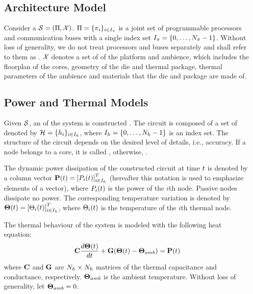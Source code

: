 \subsection{Architecture Model}
Consider a  $\mathcal{S} = (\Pi, \mathcal{X})$. $\Pi = \{ \pi_i \}_{i \in I_\pi}$ is a joint set of programmable processors and communication buses with a single index set $I_\pi = \{0, \dots, N_\pi - 1\}$. Without loss of generality, we do not treat processors and buses separately and shall refer to them as . $\mathcal{X}$ denotes a set of  of the platform and ambience, which includes the floorplan of the cores, geometry of the die and thermal package, thermal parameters of the ambience and materials that the die and package are made of.

\subsection{Power and Thermal Models}
Given $\mathcal{S}$, an  of the system is constructed \cite{kreith2000}. The circuit is composed of a set of  denoted by $\mathcal{H} = \{ h_i \}_{i \in I_h}$, where $I_h = \{ 0, \dots, N_h - 1 \}$ is an index set. The structure of the circuit depends on the desired level of details, i.e., accuracy. If a node belongs to a core, it is called , otherwise, .

The dynamic power dissipation of the constructed circuit at time $t$ is denoted by a column vector $\mathbf{P}(t) = \left[P_i(t)\right]^T_{i \in I_h}$ (hereafter this notation is used to emphasize elements of a vector), where $P_i(t)$ is the power of the $i$th node. Passive nodes dissipate no power. The corresponding temperature variation is denoted by $\mathbf{\Theta}(t) = \left[\Theta_i(t)\right]^T_{i \in I_h}$, where $\Theta_i(t)$ is the temperature of the $i$th thermal node.

The thermal behaviour of the system is modeled with the following heat equation:
\begin{equation} \equlabel{fourier}
  \mcapacitance \frac{d\vtemperature(\time)}{d\time} + \mconductance (\vtemperature(\time) - \vtemperature_{amb}) = \vpower(\time)
\end{equation}
where $\mathbf{C}$ and $\mathbf{G}$ are $N_h \times N_h$ matrices of the thermal capacitance and conductance, respectively. $\mathbf{\Theta}_{amb}$ is the ambient temperature. Without loss of generality, let $\mathbf{\Theta}_{amb} = 0$.

